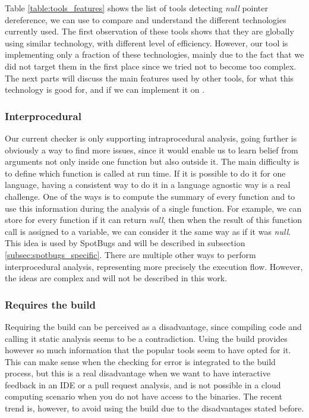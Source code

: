 Table \ref{table:tools_features} shows the list of tools detecting \emph{null} pointer dereference, we can use to compare and understand the different technologies currently used.
The first observation of these tools shows that they are globally using similar technology, with different level of efficiency.
However, our tool is implementing only a fraction of these technologies, mainly due to the fact that we did not target them in the first place since we tried not to become too complex. 
The next parts will discuss the main features used by other tools, for what this technology is good for, and if we can implement it on \slang{}.

\subsubsection{Interprocedural}
\label{subsubsec:inter_procedrual}

Our current checker is only supporting intraprocedural analysis, going further is obviously a way to find more issues, since it would enable us to learn belief from arguments not only inside one function but also outside it.
The main difficulty is to define which function is called at run time.
If it is possible to do it for one language, having a consistent way to do it in a language agnostic way is a real challenge. 
One of the ways is to compute the summary of every function and to use this information during the analysis of a single function.
For example, we can store for every function if it can return \emph{null}, then when the result of this function call is assigned to a variable, we can consider it the same way as if it was \emph{null}. 
This idea is used by SpotBugs and will be described in subsection \ref{subsec:spotbugs_specific}. 
There are multiple other ways to perform interprocedural analysis, representing more precisely the execution flow.
However, the ideas are complex and will not be described in this work.

\subsubsection{Requires the build}
\label{subsubsec:require_build}

Requiring the build can be perceived as a disadvantage, since compiling code and calling it static analysis seems to be a contradiction.
Using the build provides however so much information that the popular tools seem to have opted for it.
This can make sense when the checking for error is integrated to the build process, but this is a real disadvantage when we want to have interactive feedback in an IDE or a pull request analysis, and is not possible in a cloud computing scenario when you do not have access to the binaries. 
The recent trend is, however, to avoid using the build due to the disadvantages stated before.


